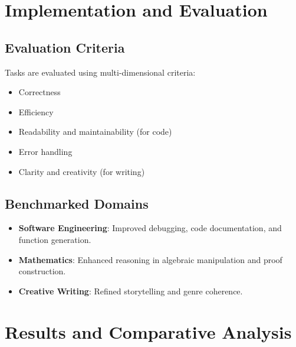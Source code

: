 \documentclass[10pt,a4paper,twocolumn]{article}
\begin{document}
\section{{Implementation and Evaluation} }





\subsection{Evaluation Criteria}


 Tasks are evaluated using multi-dimensional criteria:

\begin{itemize}
    \item Correctness
    \item Efficiency
    \item Readability and maintainability (for code)
    \item Error handling
    \item Clarity and creativity (for writing)



\end{itemize}



\subsection{Benchmarked Domains}



\begin{itemize}
    \item \textbf{Software Engineering}: Improved debugging, code documentation, and function generation.
    \item \textbf{Mathematics}: Enhanced reasoning in algebraic manipulation and proof construction.
    \item \textbf{Creative Writing}: Refined storytelling and genre coherence.
\end{itemize}





\section{{\textbf{Results and Comparative Analysis} } }
\end{document}
